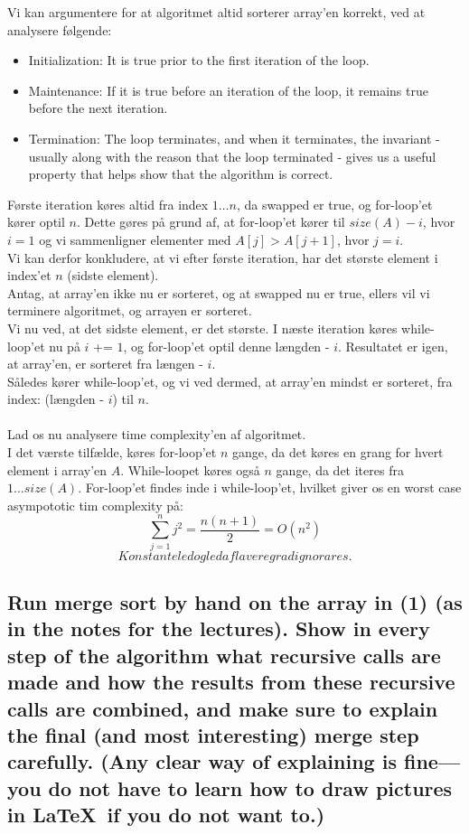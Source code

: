 \documentclass[a4paper,12pt]{article}
\begin{document}
Vi kan argumentere for at algoritmet altid sorterer array'en korrekt, ved at analysere følgende:
\begin{itemize}
    \item Initialization: It is true prior to the first iteration of the loop.
    \item Maintenance: If it is true before an iteration of the loop, it remains true before the next iteration.
    \item Termination: The loop terminates, and when it terminates, the invariant - usually along with the reason that the loop terminated - gives us a useful property that helps show that the algorithm is correct.
\end{itemize}
Første iteration køres altid fra index $1\dots n$, da swapped er true, og for-loop'et kører optil $n$. Dette gøres på grund af, at for-loop'et kører til $size(A) - i$, hvor $i = 1$ og vi sammenligner elementer med $A[j] > A[j+1]$, hvor $j = i$.\\
Vi kan derfor konkludere, at vi efter første iteration, har det største element i index'et $n$ (sidste element).\\
Antag, at array'en ikke nu er sorteret, og at swapped nu er true, ellers vil vi terminere algoritmet, og arrayen er sorteret.\\
Vi nu ved, at det sidste element, er det største. I næste iteration køres while-loop'et nu på $i$ += $1$, og for-loop'et optil denne længden - $i$. Resultatet er igen, at array'en, er sorteret fra længen - $i$.\\ 
Således kører while-loop'et, og vi ved dermed, at array'en mindst er sorteret, fra index: (længden - $i$) til $n$.\\
\\
Lad os nu analysere time complexity'en af algoritmet.\\
I det værste tilfælde, køres for-loop'et $n$ gange, da det køres en grang for hvert element i array'en $A$. While-loopet køres også $n$ gange, da det iteres fra $1\dots size(A)$. For-loop'et findes inde i while-loop'et, hvilket giver os en worst case asympototic tim complexity på:\\
\[\sum_{j=1}^{n}j^2 = \dfrac{n(n+1)}{2} = O(n^2)\]
\[Konstante led og led af lavere grad ignorares.\]

\subsection[]{Run merge sort by hand on the array in (1) (as in the notes for the lectures). Show in every step of the algorithm what recursive calls are made and how the results from these recursive calls are combined, and make sure to explain the final (and most interesting) merge step carefully. (Any clear way of explaining is fine—you do not have to learn how to draw pictures in \LaTeX\ if you do not want to.)} 
\end{document}
